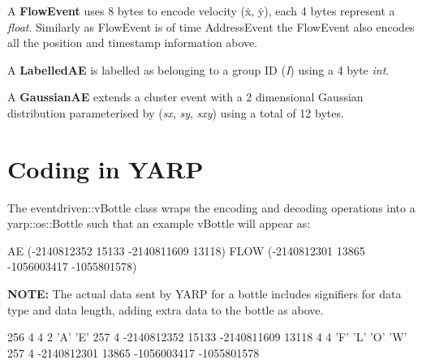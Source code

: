 A {\bfseries Flow\+Event} uses 8 bytes to encode velocity (ẋ, ẏ), each 4 bytes represent a {\itshape float}. Similarly as Flow\+Event is of time Address\+Event the Flow\+Event also encodes all the position and timestamp information above. 
\begin{DoxyCode}
\end{DoxyCode}
 A {\bfseries Labelled\+AE} is labelled as belonging to a group ID ({\itshape I}) using a 4 byte {\itshape int}. 
\begin{DoxyCode}
\end{DoxyCode}
 A {\bfseries Gaussian\+AE} extends a cluster event with a 2 dimensional Gaussian distribution parameterised by ({\itshape sx}, {\itshape sy}, {\itshape sxy}) using a total of 12 bytes. 
\begin{DoxyCode}
\end{DoxyCode}


\section*{Coding in Y\+A\+RP}

The {\ttfamily eventdriven\+::v\+Bottle} class wraps the encoding and decoding operations into a {\ttfamily yarp\+::os\+::\+Bottle} such that an example {\ttfamily v\+Bottle} will appear as\+: 
\begin{DoxyCode}
AE (-2140812352 15133 -2140811609 13118) FLOW (-2140812301 13865 -1056003417 -1055801578)
\end{DoxyCode}
 {\bfseries N\+O\+TE\+:} The actual data sent by Y\+A\+RP for a bottle includes signifiers for data type and data length, adding extra data to the bottle as above.


\begin{DoxyCode}
256 4 4 2 'A' 'E' 257 4 -2140812352 15133 -2140811609 13118 4 4 'F' 'L' 'O' 'W' 257 4 -2140812301 13865
       -1056003417 -1055801578
\end{DoxyCode}
 